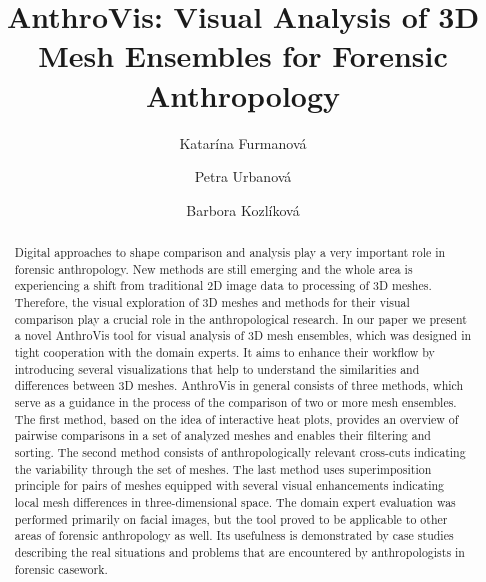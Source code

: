 \documentclass[final,5p,times]{elsarticle}
\begin{document}
\begin{frontmatter}


\title{AnthroVis: Visual Analysis of 3D Mesh Ensembles for Forensic Anthropology}

\author[fi]{Katar\'{i}na Furmanov\'{a}}
\author[ant]{Petra Urbanov\'{a}} 
\author[fi]{Barbora Kozl\'{i}kov\'{a}}
\address[fi]{Faculty of Informatics, Masaryk University, Brno, Czech Republic}
\address[ant]{Faculty of Science, Masaryk University, Brno, Czech Republic}


\begin{abstract}
Digital approaches to shape comparison and analysis play a very important role in forensic anthropology. New methods are still emerging and the whole area is experiencing a shift from traditional 2D image data to processing of 3D meshes. Therefore, the visual exploration of 3D meshes and methods for their visual comparison play a crucial role in the anthropological research. In our paper we present a novel AnthroVis tool for visual analysis of 3D mesh ensembles, which was designed in tight cooperation with the domain experts. It aims to enhance their workflow by introducing several visualizations that help to understand the similarities and differences between 3D meshes. AnthroVis in general consists of three methods, which serve as a guidance in the process of the comparison of two or more mesh ensembles. The first method, based on the idea of interactive heat plots, provides an overview of pairwise comparisons in a set of analyzed meshes and enables their filtering and sorting. The second method consists of anthropologically relevant cross-cuts indicating the variability through the set of meshes. The last method uses superimposition principle for pairs of meshes equipped with several visual enhancements indicating local mesh differences in three-dimensional space. The domain expert evaluation was performed primarily on facial images, but the tool proved to be applicable to other areas of forensic anthropology as well. Its usefulness is demonstrated by case studies describing the real situations and problems that are encountered by anthropologists in forensic casework.
\end{abstract}



\end{frontmatter}
\end{document}
